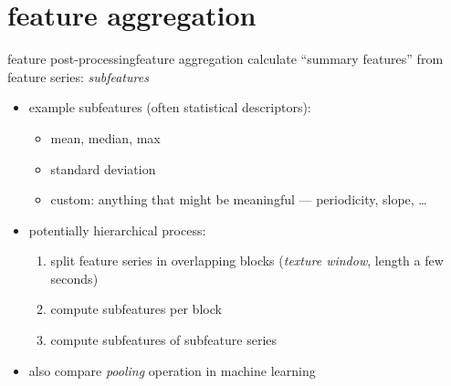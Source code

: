     \section[aggregation]{feature aggregation}
		\begin{frame}{feature post-processing}{feature aggregation}
			calculate ``summary features'' from feature series: \textit{subfeatures}

			\begin{itemize}
				\item<2->	example subfeatures (often statistical descriptors):
                    \begin{itemize}
                        \item   mean, median, max
                        \item   standard deviation
                        \item   custom: anything that might be meaningful --- periodicity, slope, \ldots
                    \end{itemize}
                \smallskip
                \item<3->   potentially hierarchical process:
                    \begin{enumerate}
                        \item   split feature series in overlapping blocks (\textit{texture window}, length a few seconds)
                        \item   compute subfeatures per block
                        \item   compute subfeatures of subfeature series
                    \end{enumerate}
                \smallskip
                \item<4->   also compare \textit{pooling} operation in machine learning
			\end{itemize}
		\end{frame}
        
